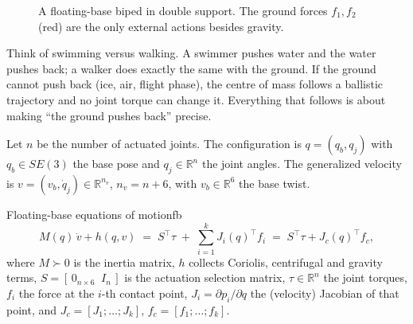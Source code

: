 \documentclass[11pt,a4paper]{article}
\newcommand{\R}{\mathbb{R}}
\newcommand{\Jc}{J_c}
\begin{document}
\begin{figure}[ht]
\centering
{}
\caption{A floating-base biped in double support. The ground forces $f_1,f_2$ (red) are the only external actions besides gravity.}
\end{figure}

\begin{intuition}
Think of swimming versus walking. A swimmer pushes water and the water pushes back; a
walker does exactly the same with the ground. If the ground cannot push back (ice, air,
flight phase), the centre of mass follows a ballistic trajectory and no joint torque can
change it. Everything that follows is about making ``the ground pushes back'' precise.
\end{intuition}


Let $n$ be the number of actuated joints. The configuration is $q=(q_b,q_j)$ with
$q_b\in SE(3)$ the base pose and $q_j\in\R^n$ the joint angles. The generalized velocity is
$v=(v_b,\dot q_j)\in\R^{n_v}$, $n_v=n+6$, with $v_b\in\R^6$ the base twist.

\begin{definition}{Floating-base equations of motion}{fb}
\begin{equation}\label{eq:eom}
  M(q)\,\dot v + h(q,v) \;=\; S^{\top}\tau \;+\; \sum_{i=1}^{k} J_i(q)^{\top} f_i
  \;=\; S^{\top}\tau + \Jc(q)^{\top} f_c ,
\end{equation}
where $M\succ0$ is the inertia matrix, $h$ collects Coriolis, centrifugal and gravity terms,
$S=[\,0_{n\times 6}\;\; I_n\,]$ is the actuation selection matrix, $\tau\in\R^n$ the joint
torques, $f_i$ the force at the $i$-th contact point, $J_i=\partial p_i/\partial q$ the
(velocity) Jacobian of that point, and $\Jc=[J_1;\dots;J_k]$, $f_c=[f_1;\dots;f_k]$.
\end{definition}
\end{document}
